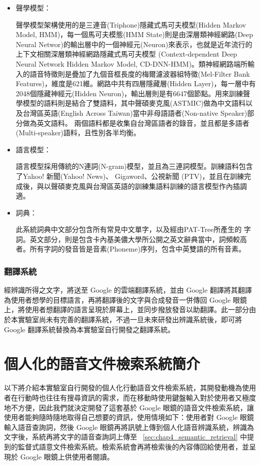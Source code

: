 \begin{itemize}

   \item 聲學模型：

聲學模型架構使用的是三連音(Triphone)隱藏式馬可夫模型(Hidden Markov Model, HMM)，每一個馬可夫模態(HMM State)則是由深層類神經網路(Deep Neural Networ)的輸出層中的一個神經元(Neuron)來表示，也就是近年流行的上下文相關深層類神經網路隱藏式馬可夫模型 (Context-dependent Deep Neural Network Hidden Markov Model,
CD-DNN-HMM)。類神經網路端所輸入的語音特徵則是疊加了九個音框長度的梅爾濾波器組特徵(Mel-Filter Bank Features)，維度是621維。網路中共有四層隱藏層(Hidden Layer)，每一層中有2048個隱藏神經元(Hidden Neuron)，輸出層則是有6647個節點。用來訓練聲學模型的語料則是結合了雙語料，其中聲碩麥克風(ASTMIC)做為中文語料以及台灣區英語(English Across Taiwan)當中非母語語者(Non-native Speaker)部分做為英文語料。
兩個語料都是收集自台灣區語者的錄音，並且都是多語者(Multi-speaker)語料，且性別各半均衡。

   \item 語言模型：

語言模型採用傳統的N連詞(N-gram)模型，並且為三連詞模型。訓練語料包含了Yahoo! 新聞(Yahoo! News)、 Gigaword、公視新聞 (PTV)，並且在訓練完成後，與以聲碩麥克風與台灣區英語的訓練集語料訓練的語言模型作內插調適。

   \item 詞典：

此系統詞典中文部分包含所有常見中文單字，以及經由PAT-Tree所產生的
字詞。英文部分，則是包含卡內基美儂大學所公開之英文辭典當中，詞頻較高者。所有字詞的發音皆是音素(Phoneme)序列，包含中英雙語的所有音素。

\end{itemize}

\subsubsection{翻譯系統}

經辨識所得之文字，將送至 Google 的雲端翻譯系統，並由 Google 翻譯將其翻譯為使用者想學的目標語言，再將翻譯後的文字與合成發音一併傳回    Google 眼鏡上，將使用者想翻譯的語言呈現於屏幕上，並同步撥放發音以助翻譯。此一部分由於本實驗室尚未有完善的翻譯系統，不過一旦未來研發出辨識系統後，即可將 Google 翻譯系統替換為本實驗室自行開發之翻譯系統。

\section{個人化的語音文件檢索系統簡介}
以下將介紹本實驗室自行開發的個人化行動語音文件檢索系統，其開發動機為使用者在行動時也往往有搜尋資訊的需求，而在移動時使用鍵盤輸入對於使用者又極度地不方便，因此我們就決定開發了這套基於 Google 眼鏡的語音文件檢索系統，讓使用者能夠隨時隨地取得自己想要的資訊，使用情境如下：使用者對 Google 眼鏡輸入語音查詢詞，然後 Google 眼鏡再將訊號上傳到個人化語音辨識系統，辨識為文字後，系統再將文字的語音查詢詞上傳至
~\ref{sec:chap4_semantic_retrieval} 中提到的監督式語意文件檢索系統。檢索系統會再將檢索後的內容傳回給使用者，並呈現於 Google 眼鏡上供使用者閱讀。


